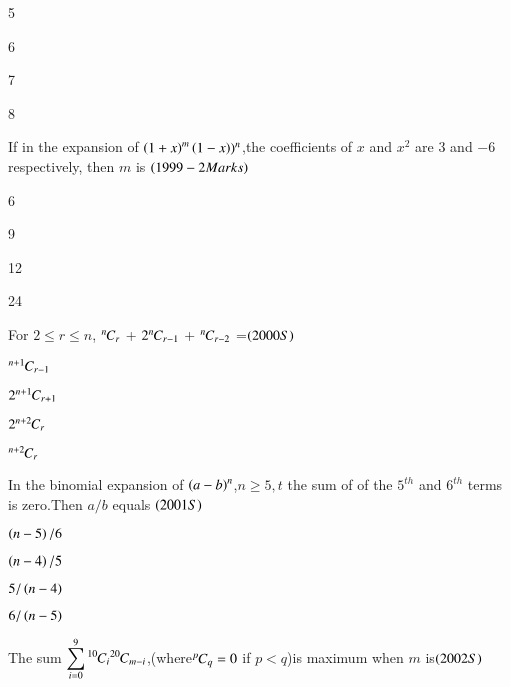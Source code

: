 \documentclass[journal,12pt,onecolumn]{IEEEtran}
\theoremstyle{remark}
\begin{document}
\begin{enumerate}
{\begin{enumerate}
\begin{multicols}{2}
    \item 5
    \item 6
    \item 7
    \item 8
    \end{multicols}
\end{enumerate}
\item If in the expansion of $\left(1+x\right)^m\left(1-x\right))^n$,the coefficients of $x$ and $x^2$ are $3$ and $-6$ respectively, then $m$ is
{\hfill$\left(1999-2Marks\right)$}
\begin{enumerate}
\begin{multicols}{2}
    \item 6
    \item 9
    \item 12
    \item 24
    \end{multicols}
\end{enumerate}
\item For $2\leq r\leq n$, ${{}^{n}\mkern-1muC_{r}}$ + $2{{}^{n}\mkern-1muC_{r-1}}$ + ${{}^{n}\mkern-1muC_{r-2}}$ =\hfill{$\left(2000S\right)$}
\begin{enumerate}\begin{multicols}{2} 
    \item ${{}^{n+1}\mkern-1muC_{r-1}}$ \item $2{{}^{n+1}\mkern-1muC_{r+1}}$
    \item $2{{}^{n+2}\mkern-1muC_{r}}$  \item ${{}^{n+2}\mkern-1muC_{r}}$
    \end{multicols}
\end{enumerate}
\item In the binomial expansion of $\left(a-b\right)^n$,$n\geq 5,t$ the sum of of the $5^{th}$ and $6^{th}$ terms is zero.Then $a/b$  equals
{\hfill $\left(2001S\right)$}
\begin{enumerate}
\begin{multicols}{2}
    \item $\left(n-5\right)/6$
    \item $\left(n-4\right)/5$
    \item $5/\left(n-4\right)$
    \item $6/\left(n-5\right)$
 \end{multicols}   
\end{enumerate}
\item The sum $\displaystyle\sum_{i=0}^{9} {{}^{10}\mkern-1muC_{i}}{{}^{20}\mkern-1muC_{m-i}}$,(where${{}^{p}\mkern-1muC_{q}}=0$ if {
$p<q$)}is maximum when $m$ is{\hfill$\left(2002S\right)$}
\begin{enumerate}
\begin{multicols}{2}

\end{multicols}
\end{enumerate}}
\end{enumerate}
\end{document}
